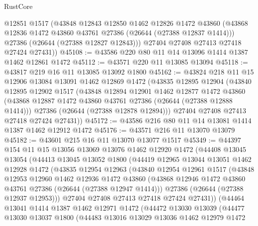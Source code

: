 \begin{lexlean}{RustCore}
\begin{coremodule}
        @12851
        @1517
        (@43848
          @12843
          @12850
          @1462
          @12826
          @1472
          @43860
          (@43868 @12836 @1472 @43860 @43761 @27386 (@26644 (@27388 @12837 @1414)))
          @27386
          (@26644 (@27388 @12827 @12843)))
        @27404
        @27408
        @27413
        @27418
        @27424
        @27431))
@45108 := @43586 @220 @80 @11 @14 @13096 @1414 @1387 @1462 @12861 @1472
@45112 := @43571 @220 @11 @13085 @13094
@45118 := @43817 @219 @16 @11 @13085 @13092 @1800
@45162 := @43824
    @218
    @11
    @15
    @12906
    @13084
    @13091
    @1462
    @12869
    @1472
    (@43835
      @12895
      @12904
      (@43840
        @12895
        @12902
        @1517
        (@43848
          @12894
          @12901
          @1462
          @12877
          @1472
          @43860
          (@43868 @12887 @1472 @43860 @43761 @27386 (@26644 (@27388 @12888 @1414)))
          @27386
          (@26644 (@27388 @12878 @12894)))
        @27404
        @27408
        @27413
        @27418
        @27424
        @27431))
@45172 := @43586 @216 @80 @11 @14 @13081 @1414 @1387 @1462 @12912 @1472
@45176 := @43571 @216 @11 @13070 @13079
@45182 := @43601 @215 @16 @11 @13070 @13077 @1517
@45349 := @44397
    @154
    @11
    @15
    @13056
    @13069
    @13076
    @1462
    @12920
    @1472
    (@44408
      @13045
      @13054
      (@44413
        @13045
        @13052
        @1800
        (@44419
          @12965
          @13044
          @13051
          @1462
          @12928
          @1472
          (@43835
            @12954
            @12963
            (@43840
              @12954
              @12961
              @1517
              (@43848
                @12953
                @12960
                @1462
                @12936
                @1472
                @43860
                (@43868 @12946 @1472 @43860 @43761 @27386 (@26644 (@27388 @12947 @1414)))
                @27386
                (@26644 (@27388 @12937 @12953)))
              @27404
              @27408
              @27413
              @27418
              @27424
              @27431))
          (@44464
            @13041
            @1414
            @1387
            @1462
            @12971
            @1472
            (@44472
              @13030
              @13039
              (@44477
                @13030
                @13037
                @1800
                (@44483
                  @13016
                  @13029
                  @13036
                  @1462
                  @12979
                  @1472

\end{coremodule}
\end{lexlean}
